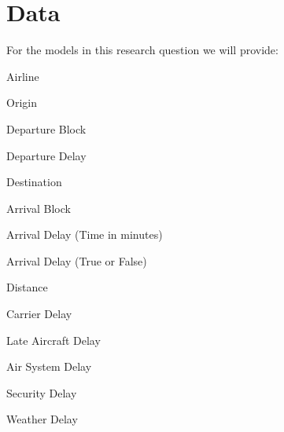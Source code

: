 \documentclass[a4paper,12pt]{article}
\begin{document}
\section{Data}
For the models in this research question we will provide:

Airline

Origin

Departure Block

Departure Delay

Destination

Arrival Block

Arrival Delay (Time in minutes)

Arrival Delay (True or False)

Distance 

Carrier Delay

Late Aircraft Delay

Air System Delay

Security Delay

Weather Delay
\end{document}
